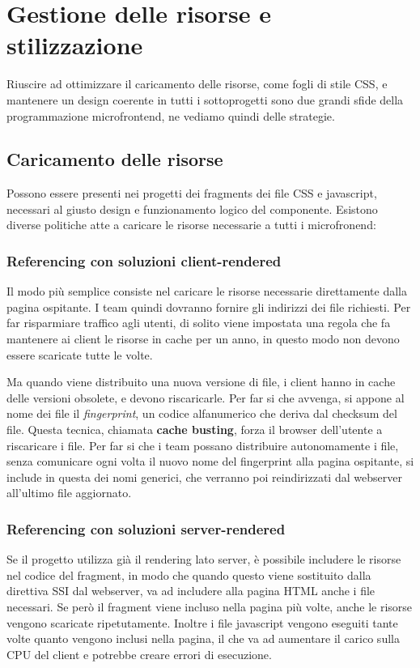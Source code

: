 \chapter{Gestione delle risorse e stilizzazione}\label{ch:gestionerisorse}

Riuscire ad ottimizzare il caricamento delle risorse, come fogli di stile CSS, 
e mantenere un design coerente in tutti i sottoprogetti sono due
 grandi sfide della programmazione microfrontend, ne vediamo quindi delle strategie.


\section{Caricamento delle risorse}
Possono essere presenti nei progetti dei fragments dei file CSS e javascript, necessari
al giusto design e funzionamento logico del componente. Esistono diverse politiche 
atte a caricare le risorse necessarie a tutti i microfronend:

\subsection{Referencing con soluzioni client-rendered}
Il modo più semplice consiste nel caricare le risorse necessarie direttamente dalla pagina ospitante.
I team quindi dovranno fornire gli indirizzi dei file richiesti.
Per far risparmiare traffico agli utenti, di solito viene impostata una regola che fa mantenere ai client
le risorse in cache per un anno, in questo modo non devono essere scaricate tutte le volte.

Ma quando viene distribuito una nuova versione di file, i client hanno in cache delle versioni obsolete, e devono riscaricarle.
Per far si che avvenga, si appone al nome dei file il \emph{fingerprint}, un codice alfanumerico che deriva dal checksum del file.
Questa tecnica, chiamata \textbf{cache busting}, forza il browser dell'utente a riscaricare i file.
Per far si che i team possano distribuire autonomamente i file, senza comunicare ogni volta il nuovo nome del
fingerprint alla pagina ospitante, si include in questa dei nomi generici, che verranno poi reindirizzati dal webserver all'ultimo file aggiornato.



\subsection{Referencing con soluzioni server-rendered}
Se il progetto utilizza già il rendering lato server, è possibile includere le risorse nel codice
del fragment, in modo che quando questo viene sostituito dalla direttiva SSI dal webserver, va ad includere
alla pagina HTML anche i file necessari. Se però il fragment viene incluso nella pagina più volte, anche le risorse vengono 
scaricate ripetutamente. Inoltre i file javascript vengono eseguiti tante volte quanto vengono inclusi nella pagina,
il che va ad aumentare il carico sulla CPU del client e potrebbe creare errori di esecuzione.